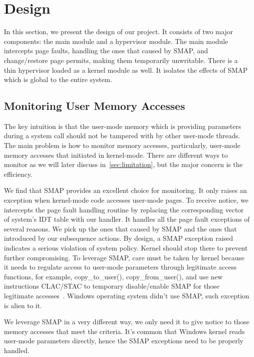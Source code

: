 
\section{Design}
\label{sec:design}

In this section, we present the design of our project. It consists of two major components: the main module and a hypervisor module. The main module intercepts page faults, handling the ones that caused by SMAP, and change/restore page permits, making them temporarily unwritable. There is a thin hypervisor loaded as a kernel module as well. It isolates the effects of SMAP which is global to the entire system.

\subsection{Monitoring User Memory Accesses}

The key intuition is that the user-mode memory which is providing parameters during a system call should not be tampered with by other user-mode threads. 
The main problem is how to monitor memory accesses, particularly, user-mode memory accesses that initiated in kernel-mode.  There are different ways to monitor as we will later discuss in~\autoref{sec:limitation}, but the major concern is the efficiency.

We find that SMAP provides an excellent choice for monitoring. It only raises an exception when kernel-mode code accesses user-mode pages. To receive notice, we intercepts the page fault handling routine by replacing the corresponding vector of system's IDT table with our handler. It handles all the page fault exceptions  of several reasons. We pick up the ones that caused by SMAP and the ones that introduced by our subsequence actions. By design, a SMAP exception raised indicates a serious violation of system policy. Kernel should stop there to prevent further compromising. To leverage SMAP, care must be taken by kernel because it needs to regulate access to user-mode parameters through legitimate access functions, for example, copy\_to\_user(), copy\_from\_user(), and use new instructions CLAC/STAC to temporary disable/enable SMAP for those legitimate accesses~\cite{corbet2012linuxsmap}. Windows operating system didn't use SMAP, such exception is alien to it. 

We leverage SMAP in a very different way, we only need it to give notice to those memory accesses that meet the criteria. It's common that Windows kernel reads user-mode parameters directly, hence the SMAP exceptions need to be properly handled. 

